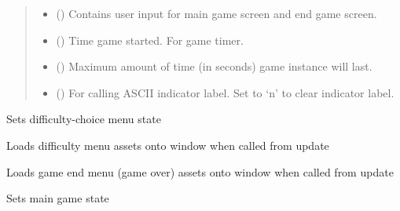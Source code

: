 \documentclass[letterpaper,10pt,english]{sphinxmanual}
\begin{document}
\begin{fulllineitems}
\begin{quote}
\begin{description}
\begin{itemize}
\item {} 
 () \textendash{} Contains user input for main game screen and
end game screen.

\item {} 
 () \textendash{} Time game started. For game timer.

\item {} 
 () \textendash{} Maximum amount of time (in seconds) game instance will last.

\item {} 
 () \textendash{} For calling ASCII indicator label. Set to ‘n’
to clear indicator label.

\end{itemize}

\end{description}\end{quote}


\begin{fulllineitems}
Sets difficulty-choice menu state

\end{fulllineitems}



\begin{fulllineitems}
Loads difficulty menu assets onto window when called from update

\end{fulllineitems}



\begin{fulllineitems}
Loads game end menu (game over) assets onto window when called from update

\end{fulllineitems}



\begin{fulllineitems}
Sets main game state


\end{fulllineitems}
\end{fulllineitems}
\end{document}
